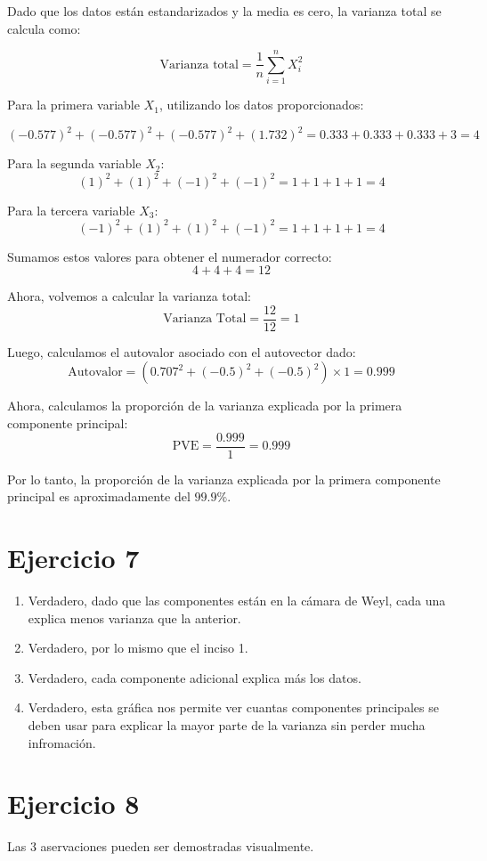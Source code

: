 \documentclass{article}
\begin{document}
Dado que los datos están estandarizados y la media es cero, la varianza total se calcula como:

\[
\text{Varianza total} = \frac{1}{n} \sum_{i=1}^{n} X_i^2
\]

Para la primera variable \( X_1 \), utilizando los datos proporcionados:

\[
(-0.577)^2 + (-0.577)^2 + (-0.577)^2 + (1.732)^2 = 0.333 + 0.333 + 0.333 + 3 = 4
\]

Para la segunda variable \( X_2 \):
\[
(1)^2 + (1)^2 + (-1)^2 + (-1)^2 = 1 + 1 + 1 + 1 = 4
\]

Para la tercera variable \( X_3 \):
\[
(-1)^2 + (1)^2 + (1)^2 + (-1)^2 = 1 + 1 + 1 + 1 = 4
\]

Sumamos estos valores para obtener el numerador correcto:
\[
4 + 4 + 4 = 12
\]

Ahora, volvemos a calcular la varianza total:
\[
\text{Varianza Total} = \frac{12}{12} = 1
\]

Luego, calculamos el autovalor asociado con el autovector dado:
\[
\text{Autovalor} = (0.707^2 + (-0.5)^2 + (-0.5)^2) \times 1 = 0.999
\]

Ahora, calculamos la proporción de la varianza explicada por la primera componente principal:
\[
\text{PVE} = \frac{0.999}{1} = 0.999
\]

Por lo tanto, la proporción de la varianza explicada por la primera componente principal es aproximadamente del \(99.9\%\).


\section{Ejercicio 7}
\begin{enumerate}
    \item Verdadero, dado que las componentes están en la cámara de Weyl, cada una explica menos varianza que la anterior.
    \item Verdadero, por lo mismo que el inciso 1.
    \item Verdadero, cada componente adicional explica más los datos.
    \item Verdadero, esta gráfica nos permite ver cuantas componentes principales se deben usar para explicar la mayor parte de la varianza sin perder mucha infromación.
\end{enumerate}


\section{Ejercicio 8}
Las 3 aservaciones pueden ser demostradas visualmente.
\end{document}
